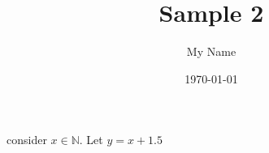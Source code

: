 \documentclass{article} %
\title{Sample 2} %
\author{My Name} %
\date{\today} %
\begin{document}
    consider $x \in \mathbb{N}$. Let $y = x + 1.5$
\end{document}
